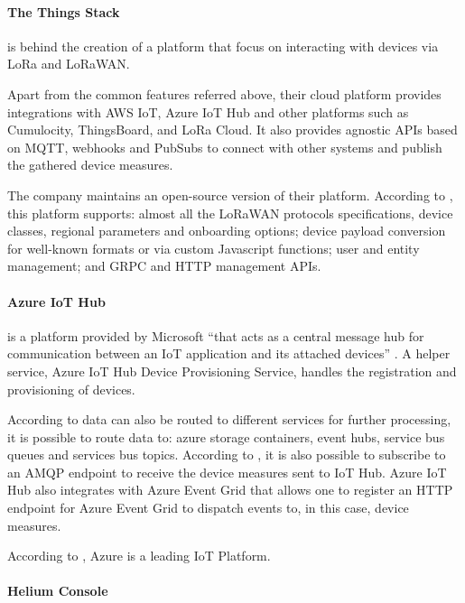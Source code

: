 \paragraph{The Things Stack}
\label{par:stateofart:arch:infra:middleware:ttn}

 is behind the creation of a platform that focus on interacting with devices via LoRa and LoRaWAN.

Apart from the common features referred above, their cloud platform provides integrations with AWS IoT, Azure IoT Hub and other platforms such as Cumulocity, ThingsBoard, and LoRa Cloud. It also provides agnostic \gls{API}s based on \gls{MQTT}, webhooks and PubSubs to connect with other systems and publish the gathered device measures.

The company maintains an open-source version of their platform. According to , this platform supports: almost all the LoRaWAN protocols specifications, device classes, regional parameters and onboarding options; device payload conversion for well-known formats or via custom Javascript functions; user and entity management; and GRPC and HTTP management \gls{API}s. 

\paragraph{Azure IoT Hub}
\label{par:stateofart:arch:infra:middleware:azure}

 is a platform provided by Microsoft ``that acts as a central message hub for communication between an IoT application and its attached devices'' \parencite{azure-hub}. A helper service, Azure IoT Hub Device Provisioning Service, handles the registration and provisioning of devices.

According to \cite{azure-hub} data can also be routed to different services for further processing, it is possible to route data to: azure storage containers, event hubs, service bus queues and services bus topics. According to \cite{azure-hub-amqp}, it is also possible to subscribe to an \gls{AMQP} endpoint to receive the device measures sent to \gls{IoT} Hub. Azure IoT Hub also integrates with Azure Event Grid that allows one to register an HTTP endpoint for Azure Event Grid to dispatch events to, in this case, device measures.

According to , Azure is a leading \gls{IoT} Platform.

\paragraph{Helium Console}
\label{par:stateofart:arch:infra:middleware:helium}

